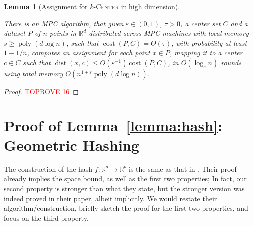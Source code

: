 \documentclass[11pt,letterpaper]{article}
\theoremstyle{plain}
\newtheorem{lemma}[theorem]{Lemma}
\theoremstyle{definition}
\theoremstyle{remark}
\newcommand{\ProblemName}[1]{\textsc{#1}}
\newcommand{\kCenter}{$k$-\ProblemName{Center}\xspace}
\DeclareMathOperator{\poly}{poly}
\DeclareMathOperator{\cost}{cost}
\DeclareMathOperator{\dist}{dist}
\begin{document}
\begin{lemma}[Assignment for \kCenter in high dimension]
    \label{lemma:assignment_high_dim}




    There is an MPC algorithm, that given $\varepsilon\in (0, 1)$, $\tau > 0$,
    a center set $C$ and a dataset $P$ of $n$ points in $\mathbb{R}^{d}$ distributed across MPC machines
    with local memory $s\geq \poly(d\log n)$, such that $\cost(P, C) = \Theta(\tau)$, with probability at least $1-1/n$, computes an assignment for each point $x\in P$, mapping it to a center $c\in C$ such that $\dist(x, c)\leq O(\varepsilon^{-1})\cost(P, C)$, in $O(\log_{s}n)$ rounds using total memory $O(n^{1+\varepsilon}\poly(d\log n))$. 
\end{lemma}
\begin{proof}\textcolor{red}{TOPROVE 16}\end{proof}


























     







    

\appendix


    \section{Proof of Lemma~\ref{lemma:hash}: Geometric Hashing}
\label{sec:proof_hashing}

\lemmahash*

The construction of the hash $f: \mathbb{R}^{d}\to \mathbb{R}^{d}$ is the same as that  in \cite[Theorem 5.3]{arxiv.2204.02095}.
Their proof already implies the space bound, as well as the first two properties;
In fact, our second property is stronger than what they state, 
but the stronger version was indeed proved in their paper, albeit implicitly.
We would restate their algorithm/construction, briefly sketch the proof for the first two properties,  and focus on the third property.
\end{document}
